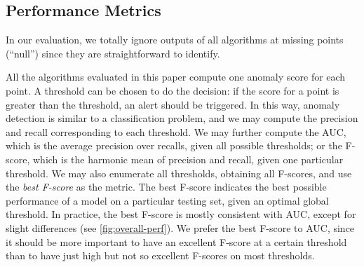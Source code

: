 \documentclass[sigconf]{acmart}
\newcommand\compactvspace[1]{\vspace{#1}}
\newcommand\compactvspace[1]{}
\begin{document}

\compactvspace{-1.5em}
\subsection{Performance Metrics}
\label{sec:performance-metrics}

In our evaluation, we totally ignore outputs of all algorithms at missing points (``null'') since they are straightforward to identify.

All the algorithms evaluated in this paper compute one anomaly score for each point. A threshold can be chosen to do the decision: if the score for a point is greater than the threshold, an alert should be triggered.
In this way, anomaly detection is similar to a classification problem, and we may compute the precision and recall corresponding to each threshold.
We may further compute the AUC, which is the average precision over recalls, given all possible thresholds; or the F-score, which is the harmonic mean of precision and recall, given one particular threshold.
We may also enumerate all thresholds, obtaining all F-scores, and use the \textit{best F-score} as the metric.
The best F-score indicates the best possible performance of a model on a particular testing set, given an optimal global threshold.
In practice, the best F-score is mostly consistent with AUC, except for slight differences (see \cref{fig:overall-perf}).
We prefer the best F-score to AUC, since it should be more important to have an excellent F-score at a certain threshold than to have just high but not so excellent F-scores on most thresholds.
\end{document}
